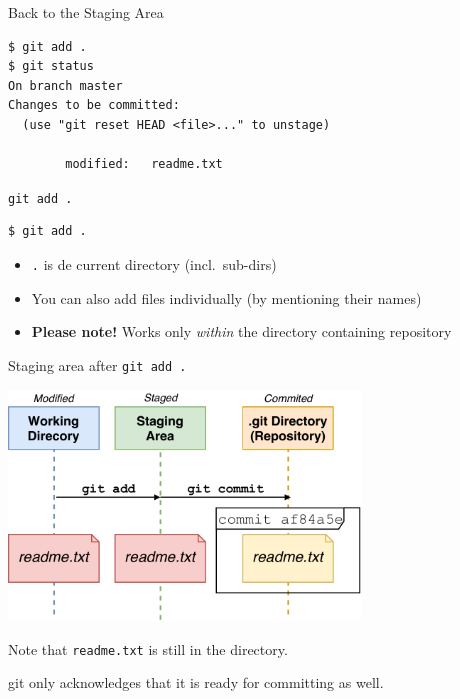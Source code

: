 \documentclass[
  11pt,
  american,
  ignorenonframetext,
  aspectratio=43,
  compress,
  xcolor=dvipsnames]{beamer}
\providecommand{\tightlist}{%
  \setlength{\itemsep}{0pt}\setlength{\parskip}{0pt}}
\begin{document}
\begin{frame}[fragile]{Back to the Staging Area}
\protect\hypertarget{back-to-the-staging-area}{}
\begin{verbatim}
$ git add .
$ git status
On branch master
Changes to be committed:
  (use "git reset HEAD <file>..." to unstage)

        modified:   readme.txt
\end{verbatim}
\end{frame}

\begin{frame}[fragile]{\texttt{git\ add\ .}}
\protect\hypertarget{git-add-.}{}
\begin{verbatim}
$ git add .
\end{verbatim}

\begin{itemize}
\tightlist
\item
  \texttt{.} is de current directory (incl.~sub-dirs)
\item
  You can also add files individually (by mentioning their names)
\item
  \textbf{Please note!} Works only \emph{within} the directory
  containing repository
\end{itemize}
\end{frame}

\begin{frame}[fragile]{Staging area after \texttt{git\ add\ .}}
\protect\hypertarget{staging-area-after-git-add-.}{}
\begin{center}
\includegraphics[width=0.7\textwidth]{./images/git_workflow_add_dot.pdf}
\end{center}

Note that \texttt{readme.txt} is still in the directory.

git only acknowledges that it is ready for committing as well.
\end{frame}
\end{document}
